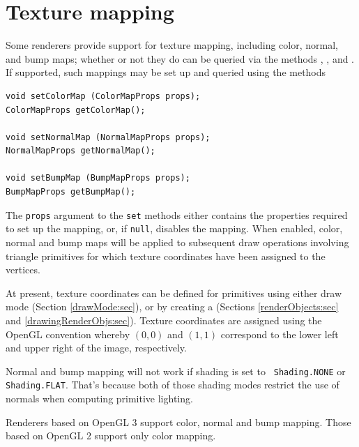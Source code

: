 %

\section{Texture mapping}
\label{mappings:sec}

Some renderers provide support for texture mapping, including
color, normal, and bump maps;
whether or not they do can be queried via the methods
,
, and
.  If supported,
such mappings may be set up and queried using the methods
%
\begin{lstlisting}[]
void setColorMap (ColorMapProps props);
ColorMapProps getColorMap();

void setNormalMap (NormalMapProps props);
NormalMapProps getNormalMap();

void setBumpMap (BumpMapProps props);
BumpMapProps getBumpMap();
\end{lstlisting}
%
The {\tt props} argument to the {\tt set} methods either contains the
properties required to set up the mapping, or, if {\tt null}, disables
the mapping. When enabled, color, normal and bump maps will be
applied to subsequent draw operations involving triangle primitives
for which texture coordinates have been assigned to the vertices.

\begin{sideblock}
At present, texture coordinates can be defined for primitives using
either draw mode (Section \ref{drawMode:sec}), or by creating a 
 (Sections
\ref{renderObjects:sec} and \ref{drawingRenderObjs:sec}).  Texture
coordinates are assigned using the OpenGL convention whereby $(0,0)$ and
$(1,1)$ correspond to the lower left and upper right of the image,
respectively.
\end{sideblock}

\begin{sideblock}
Normal and bump mapping will not work if shading is set to {\tt
Shading.NONE} or {\tt Shading.FLAT}. That's because both of those
shading modes restrict the use of normals when computing primitive
lighting.
\end{sideblock}

\begin{sideblock}
Renderers based on OpenGL 3 support color, normal and bump mapping.
Those based on OpenGL 2 support only color mapping.
\end{sideblock}

